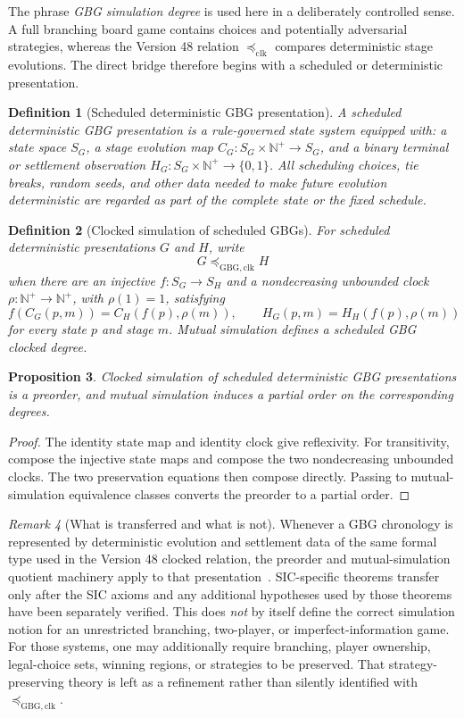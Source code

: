 \documentclass[11pt]{article}
\newtheorem{definition}{Definition}[section]
\newtheorem{proposition}[definition]{Proposition}
\theoremstyle{remark}
\newtheorem{remark}[definition]{Remark}
\newcommand{\Npos}{\mathbb N^{+}}
\newcommand{\preclk}{\preceq_{\mathrm{clk}}}
\begin{document}
The phrase \emph{GBG simulation degree} is used here in a deliberately controlled sense.
A full branching board game contains choices and potentially adversarial strategies, whereas the
Version 48 relation \(\preclk\) compares deterministic stage evolutions.
The direct bridge therefore begins with a scheduled or deterministic presentation.

\begin{definition}[Scheduled deterministic GBG presentation]
A scheduled deterministic GBG presentation is a rule-governed state system equipped with:
a state space \(S_G\), a stage evolution map \(C_G:S_G\times\Npos\to S_G\), and a binary terminal or
settlement observation \(H_G:S_G\times\Npos\to\{0,1\}\).
All scheduling choices, tie breaks, random seeds, and other data needed to make future evolution
deterministic are regarded as part of the complete state or the fixed schedule.
\end{definition}

\begin{definition}[Clocked simulation of scheduled GBGs]
For scheduled deterministic presentations \(G\) and \(H\), write
\[
G\preceq_{\mathrm{GBG,clk}}H
\]
when there are an injective \(f:S_G\to S_H\) and a nondecreasing unbounded clock
\(\rho:\Npos\to\Npos\), with \(\rho(1)=1\), satisfying
\[
f(C_G(p,m))=C_H(f(p),\rho(m)),
\qquad
H_G(p,m)=H_H(f(p),\rho(m))
\]
for every state \(p\) and stage \(m\).
Mutual simulation defines a scheduled GBG clocked degree.
\end{definition}

\begin{proposition}
Clocked simulation of scheduled deterministic GBG presentations is a preorder, and mutual simulation
induces a partial order on the corresponding degrees.
\end{proposition}

\begin{proof}
The identity state map and identity clock give reflexivity.
For transitivity, compose the injective state maps and compose the two nondecreasing unbounded clocks.
The two preservation equations then compose directly.
Passing to mutual-simulation equivalence classes converts the preorder to a partial order.
\end{proof}

\begin{remark}[What is transferred and what is not]
Whenever a GBG chronology is represented by deterministic evolution and settlement data of the same
formal type used in the Version 48 clocked relation, the preorder and mutual-simulation quotient machinery
apply to that presentation~\cite{TennesonDepths48}.  SIC-specific theorems transfer only after the SIC
axioms and any additional hypotheses used by those theorems have been separately verified.
This does \emph{not} by itself define the correct simulation notion for an unrestricted branching,
two-player, or imperfect-information game.
For those systems, one may additionally require branching, player ownership, legal-choice sets,
winning regions, or strategies to be preserved.
That strategy-preserving theory is left as a refinement rather than silently identified with
\(\preceq_{\mathrm{GBG,clk}}\).
\end{remark}
\end{document}
